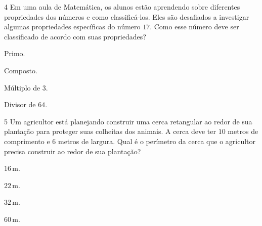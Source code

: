 \num{4} Em uma aula de Matemática, os alunos estão aprendendo sobre diferentes
propriedades dos números e como classificá-los. Eles são desafiados a investigar
algumas propriedades específicas do número $17$. Como esse número deve ser classificado
de acordo com suas propriedades?

\begin{escolha}
\item
  Primo.
\item
  Composto.
\item
  Múltiplo de $3$.
\item
  Divisor de $64$.
\end{escolha}




\num{5} Um agricultor está planejando construir uma cerca retangular ao redor
de sua plantação para proteger suas colheitas dos animais. A cerca deve ter
$10$ metros de comprimento e $6$ metros de largura. Qual é o perímetro da cerca
que o agricultor precisa construir ao redor de sua plantação?

\begin{escolha}
\item $16\,\text{m}$.
\item $22\,\text{m}$.
\item $32\,\text{m}$.
\item $60\,\text{m}$.
\end{escolha}


